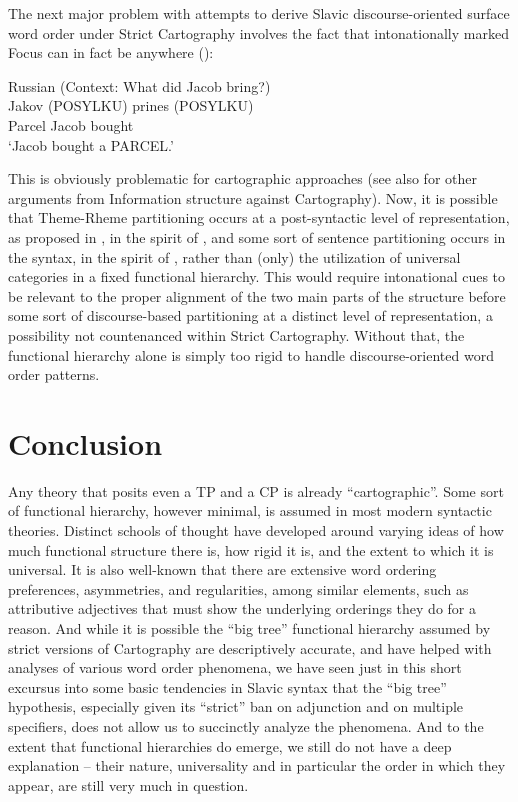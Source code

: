 \documentclass[output=paper]{langscibook}
\begin{document}
The next major problem with attempts to derive Slavic discourse-oriented surface word order under Strict Cartography involves the fact that intonationally marked Focus can in fact be anywhere (\citealt{Bailyn2012}):

\begin{exe}
\ex \label{bai20}
Russian
(Context: What did Jacob bring?) \\
	{Jakov}	{(POSYLKU)} {prines} {(POSYLKU)} \\ 
Parcel Jacob {} bought \\
\glt `Jacob bought a PARCEL.'\\
\end{exe}

This is obviously problematic for cartographic approaches (see also \citealt{wagner2009focus} for other arguments from Information structure against Cartography). Now, it is possible that Theme-Rheme partitioning occurs at a post-syntactic level of representation, as proposed in \citet{Bailyn2012}, in the spirit of \citet{Zubizarreta:1998}, and some sort of sentence partitioning occurs in the syntax, in the spirit of \citet{Diesing1992}, rather than (only) the utilization of universal categories in a fixed functional hierarchy. This would require intonational cues to be relevant to the proper alignment of the two main parts of the structure before some sort of discourse-based partitioning at a distinct level of representation, a possibility not countenanced within Strict Cartography. Without that, the functional hierarchy alone is simply too rigid to handle discourse-oriented word order patterns.

\section{Conclusion}

Any theory that posits even a TP and a CP is already “cartographic”.  Some sort of functional hierarchy, however minimal, is assumed in most modern syntactic theories. Distinct schools of thought have developed around varying ideas of how much functional structure there is, how rigid it is, and the extent to which it is universal. It is also well-known that there are extensive word ordering preferences, asymmetries, and regularities, among similar elements, such as attributive adjectives that must show the underlying orderings they do for a reason. And while it is possible the “big tree” functional hierarchy assumed by strict versions of Cartography are descriptively accurate, and have helped with analyses of various word order phenomena, we have seen just in this short excursus into some basic tendencies in Slavic syntax that the “big tree” hypothesis, especially given its “strict” ban on adjunction and on multiple specifiers, does not allow us to succinctly analyze the phenomena.  And to the extent that functional hierarchies do emerge, we still do not have a deep explanation – their nature, universality and in particular the order in which they appear, are still very much in question.   
\end{document}

